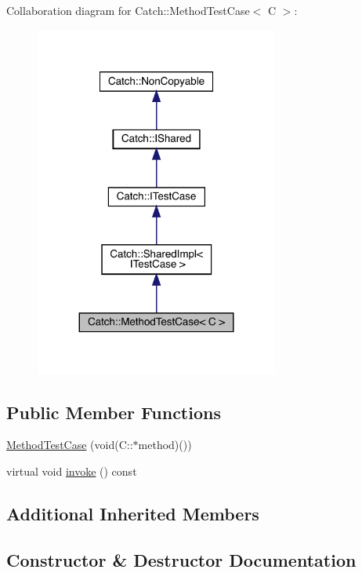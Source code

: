 Collaboration diagram for Catch\+:\+:Method\+Test\+Case$<$ C $>$\+:
\nopagebreak
\begin{figure}[H]
\begin{center}
\leavevmode
\includegraphics[width=227pt]{class_catch_1_1_method_test_case__coll__graph}
\end{center}
\end{figure}
\subsection*{Public Member Functions}
\begin{DoxyCompactItemize}
\item 
\hyperlink{class_catch_1_1_method_test_case_a7b043b85dae371358255dd9dc6582e7b}{Method\+Test\+Case} (void(C\+::$\ast$method)())
\item 
virtual void \hyperlink{class_catch_1_1_method_test_case_a4e2263cfa0646f2980768328cb372793}{invoke} () const
\end{DoxyCompactItemize}
\subsection*{Additional Inherited Members}


\subsection{Constructor \& Destructor Documentation}
\mbox{\label{class_catch_1_1_method_test_case_a7b043b85dae371358255dd9dc6582e7b}} 
